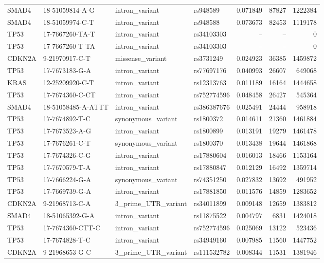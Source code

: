 \begin{footnotesize}
\begin{longtable}{llllrrr}
SMAD4 & 18-51059814-A-G & intron\_variant & rs948589 & 0.071849 & 87827 & 1222384 \\
SMAD4 & 18-51059974-C-T & intron\_variant & rs948588 & 0.073673 & 82453 & 1119178 \\
TP53 & 17-7667260-TA-T & intron\_variant & rs34103303 & -- & -- & 0 \\
TP53 & 17-7667260-T-TA & intron\_variant & rs34103303 & -- & -- & 0 \\
CDKN2A & 9-21970917-C-T & missense\_variant & rs3731249 & 0.024923 & 36385 & 1459872 \\
TP53 & 17-7673183-G-A & intron\_variant & rs77697176 & 0.040993 & 26607 & 649068 \\
KRAS & 12-25209920-C-T & intron\_variant & rs12313763 & 0.011189 & 16164 & 1444658 \\
TP53 & 17-7674360-C-CT & intron\_variant & rs752774596 & 0.048458 & 26427 & 545364 \\
SMAD4 & 18-51058485-A-ATTT & intron\_variant & rs386387676 & 0.025491 & 24444 & 958918 \\
TP53 & 17-7674892-T-C & synonymous\_variant & rs1800372 & 0.014611 & 21360 & 1461884 \\
TP53 & 17-7673523-A-G & intron\_variant & rs1800899 & 0.013191 & 19279 & 1461478 \\
TP53 & 17-7676261-C-T & synonymous\_variant & rs1800370 & 0.013438 & 19644 & 1461868 \\
TP53 & 17-7674326-C-G & intron\_variant & rs17880604 & 0.016013 & 18466 & 1153164 \\
TP53 & 17-7670579-T-A & intron\_variant & rs17880847 & 0.012129 & 16492 & 1359714 \\
TP53 & 17-7666224-G-A & synonymous\_variant & rs74351250 & 0.027832 & 13692 & 491952 \\
TP53 & 17-7669739-G-A & intron\_variant & rs17881850 & 0.011576 & 14859 & 1283652 \\
CDKN2A & 9-21968713-C-A & 3\_prime\_UTR\_variant & rs34011899 & 0.009148 & 12659 & 1383812 \\
SMAD4 & 18-51065392-G-A & intron\_variant & rs11875522 & 0.004797 & 6831 & 1424018 \\
TP53 & 17-7674360-CTT-C & intron\_variant & rs752774596 & 0.025069 & 13122 & 523436 \\
TP53 & 17-7674828-T-C & intron\_variant & rs34949160 & 0.007985 & 11560 & 1447752 \\
CDKN2A & 9-21968653-G-C & 3\_prime\_UTR\_variant & rs111532782 & 0.008344 & 11531 & 1381946 \\

\end{longtable}
\end{footnotesize}
